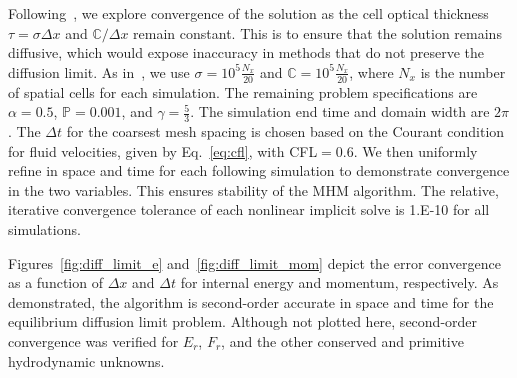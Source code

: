 \documentclass[preprint,12pt]{elsarticle}
\newcommand{\E}{{E_r}}
\newcommand{\F}{{F_r}}
\begin{document}
Following~\cite{mcclarren2}, we explore convergence of the solution as the cell optical thickness $\tau=\sigma \Delta x$ and
$\mathbb{C}/\Delta x$ remain constant.  This is to ensure that the solution remains diffusive, which would expose inaccuracy in methods that
do not preserve the diffusion limit.  As in~\cite{mcclarren2}, we use $\sigma=10^5\frac{N_x}{20}$ and $\mathbb{C}=10^5\frac{N_x}{20}$,
where $N_x$ is the number of spatial cells for each simulation.  The remaining problem specifications are $\alpha=0.5$, $\mathbb{P}=0.001$, 
and ${\gamma=\frac{5}{3}}$.  The simulation end time and domain width are $2\pi$. The $\Delta t$ for the coarsest mesh spacing is
chosen based on the Courant condition for fluid velocities, given by Eq.~\eqref{eq:cfl}, with CFL$=0.6$.    We
then uniformly refine in space and time for each following simulation to demonstrate convergence in the two variables. This ensures stability
of the MHM algorithm. The relative, iterative
convergence tolerance of each nonlinear implicit solve is 1.E-10 for all simulations.

Figures~\ref{fig:diff_limit_e} and~\ref{fig:diff_limit_mom} depict the error convergence as a function of $\Delta x$ and $\Delta t$ for
internal energy and momentum, respectively.  As demonstrated, the algorithm is second-order accurate in space and time for the equilibrium diffusion limit problem.  Although not plotted here,
second-order convergence
was verified for $\E$, $\F$, and the other conserved and primitive hydrodynamic unknowns.
\end{document}
